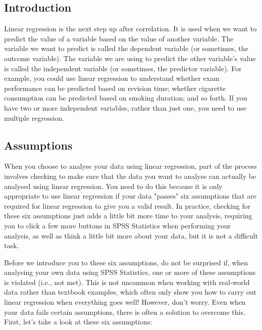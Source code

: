 \documentclass[]{article}
\begin{document}
	
	\subsection{Introduction}
	Linear regression is the next step up after correlation. It is used when we want to predict the value of a variable based on the value of another variable. The variable we want to predict is called the dependent variable (or sometimes, the outcome variable). The variable we are using to predict the other variable's value is called the independent variable (or sometimes, the predictor variable). For example, you could use linear regression to understand whether exam performance can be predicted based on revision time; whether cigarette consumption can be predicted based on smoking duration; and so forth. If you have two or more independent variables, rather than just one, you need to use multiple regression.
	
	\subsection{Assumptions}
	When you choose to analyse your data using linear regression, part of the process involves checking to make sure that the data you want to analyse can actually be analysed using linear regression. You need to do this because it is only appropriate to use linear regression if your data "passes" six assumptions that are required for linear regression to give you a valid result. In practice, checking for these six assumptions just adds a little bit more time to your analysis, requiring you to click a few more buttons in SPSS Statistics when performing your analysis, as well as think a little bit more about your data, but it is not a difficult task.
	
	Before we introduce you to these six assumptions, do not be surprised if, when analysing your own data using SPSS Statistics, one or more of these assumptions is violated (i.e., not met). This is not uncommon when working with real-world data rather than textbook examples, which often only show you how to carry out linear regression when everything goes well! However, don’t worry. Even when your data fails certain assumptions, there is often a solution to overcome this. First, let’s take a look at these six assumptions:
	
\end{document}
